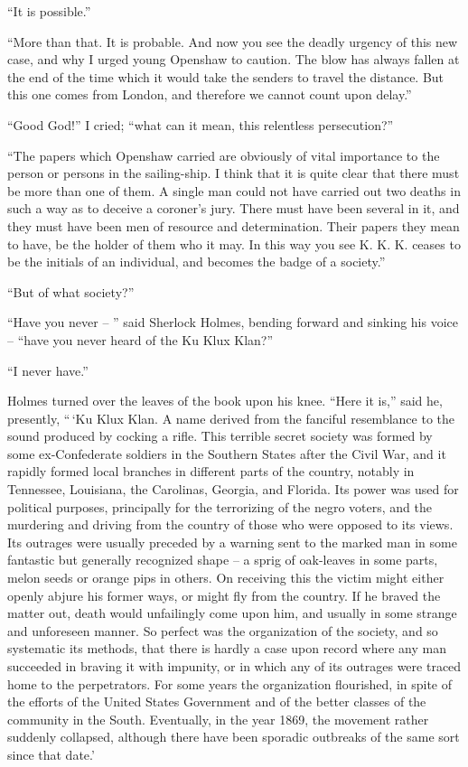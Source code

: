 “It is possible.”

“More than that. It is probable. And now you see the
deadly urgency of this new case, and why I urged young Openshaw
to caution. The blow has always fallen at the end of
the time which it would take the senders to travel the distance.
But this one comes from London, and therefore we cannot
count upon delay.”

“Good God!” I cried; “what can it mean, this relentless
persecution?”

“The papers which Openshaw carried are obviously of vital
importance to the person or persons in the sailing-ship. I
think that it is quite clear that there must be more than one
of them. A single man could not have carried out two deaths
in such a way as to deceive a coroner’s jury. There must
have been several in it, and they must have been men of resource
and determination. Their papers they mean to have,
be the holder of them who it may. In this way you see K.
K. K. ceases to be the initials of an individual, and becomes
the badge of a society.”

“But of what society?”

“Have you never -- ” said Sherlock Holmes, bending forward
and sinking his voice -- “have you never heard of the
Ku Klux Klan?”

“I never have.”

Holmes turned over the leaves of the book upon his knee.
“Here it is,” said he, presently, “\,‘Ku Klux Klan. A name
derived from the fanciful resemblance to the sound produced
by cocking a rifle. This terrible secret society was formed by
some ex-Confederate soldiers in the Southern States after the
Civil War, and it rapidly formed local branches in different
parts of the country, notably in Tennessee, Louisiana, the
Carolinas, Georgia, and Florida. Its power was used for political
purposes, principally for the terrorizing of the negro
voters, and the murdering and driving from the country of
those who were opposed to its views. Its outrages were usually
preceded by a warning sent to the marked man in some
fantastic but generally recognized shape -- a sprig of oak-leaves
in some parts, melon seeds or orange pips in others. On receiving
this the victim might either openly abjure his former
ways, or might fly from the country. If he braved the matter
out, death would unfailingly come upon him, and usually in
some strange and unforeseen manner. So perfect was the organization
of the society, and so systematic its methods, that
there is hardly a case upon record where any man succeeded
in braving it with impunity, or in which any of its outrages
were traced home to the perpetrators. For some years
the organization flourished, in spite of the efforts of the
United States Government and of the better classes of the
community in the South. Eventually, in the year 1869,
the movement rather suddenly collapsed, although there
have been sporadic outbreaks of the same sort since that
date.’

